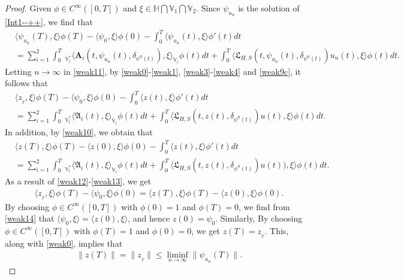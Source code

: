 \documentclass[11pt]{article}
\renewcommand{\leq}{\leqslant}
\numberwithin{equation}{section}
\begin{document}
\begin{proof}
Given $\phi\in C^\infty([0,T])$
and $\xi\in \mathbb{H}\bigcap\mathbb{V}_1
\bigcap\mathbb{V}_2$. Since $\psi_{u_n}$ is the solution of \eqref{Int1--++}, we find that
\begin{align}\label{weak11}
&\langle \psi_{u_n}(T) ,\xi\rangle\phi(T)
-\langle \psi_0 ,\xi\rangle\phi(0)-\int_0^T\langle
\psi_{u_n}(t) ,\xi\rangle\phi'(t)dt
\nonumber\\&=\sum_{i=1}^2
 \int_{0}^T\ _{\mathbb{V}_i^*}\big\langle \mathbf{A}_i(t,\psi_{u_n}(t),
\delta_{\psi^0(t)}),
\xi\big  \rangle_{\mathbb{V}_i}  \phi(t)      dt
 +\int_{0}^T
 \big\langle \mathfrak{L}_{H,S}(t,\psi_{u_n}(t),
\delta_{\psi^0(t)})u_n(t),\xi \big\rangle\phi(t) dt.
\end{align}
Letting $n\rightarrow\infty$ in \eqref{weak11},
by \eqref{weak0}-\eqref{weak1}, \eqref{weak3}-\eqref{weak4} and \eqref{weak9c},  it follows that
\begin{align}\label{weak12}&
\langle z_{_{T}} ,\xi\rangle\phi(T)
-\langle \psi_0 ,\xi\rangle\phi(0)-\int_0^T\langle
z(t) ,\xi\rangle\phi'(t)dt
\nonumber\\&=\sum_{i=1}^2
 \int_{0}^T\ _{\mathbb{V}_i^*}\big\langle \mathfrak{A}_i(t),
\xi\big  \rangle_{\mathbb{V}_i}  \phi(t)      dt
 +\int_{0}^T
 \big\langle \mathfrak{L}_{H,S}(t,z(t),
\delta_{\psi^0(t)})u(t),\xi \big\rangle\phi(t) dt.
\end{align}
In addition, by \eqref{weak10}, we obtain that \begin{align}\label{weak13}&
\langle z(T) ,\xi\rangle\phi(T)
-\langle z(0) ,\xi\rangle\phi(0)
-\int_0^T\langle
z(t) ,\xi\rangle\phi'(t)dt
\nonumber\\&=\sum_{i=1}^2
 \int_{0}^T\ _{\mathbb{V}_i^*}\big\langle \mathfrak{A}_i(t),
\xi\big  \rangle_{\mathbb{V}_i}  \phi(t)      dt
 +\int_{0}^T
 \big\langle \mathfrak{L}_{H,S}(t,z(t),
\delta_{\psi^0(t)})u(t)),\xi \big\rangle\phi(t) dt.
\end{align}
As a result of \eqref{weak12}-\eqref{weak13}, we get
\begin{align}\label{weak14}&
\langle z_{_{T}} ,\xi\rangle\phi(T)
-\langle \psi_0 ,\xi\rangle\phi(0)=\langle z(T) ,\xi\rangle\phi(T)
-\langle z(0) ,\xi\rangle\phi(0).
\end{align}
By choosing $\phi\in C^\infty([0,T])$ with  $\phi(0)=1$ and $\phi(T)=0$, we find from \eqref{weak14} that $\langle \psi_0 ,\xi\rangle=\langle z(0) ,\xi\rangle$, and hence  $z(0)=\psi_0$.
Similarly,
By choosing $\phi\in C^\infty([0,T])$ with  $\phi(T)=1$ and $\phi(0)=0$,
we get  $z(T)=z_{_{T}}$. This, along with \eqref{weak0}, implies that
\begin{align}\label{weak15}
&\|z(T)\|=\|z_{_{T}}\|\leq
\liminf_{n\rightarrow\infty}
\|\psi_{u_n}(T)\|.
\end{align}


\end{proof}
\end{document}

